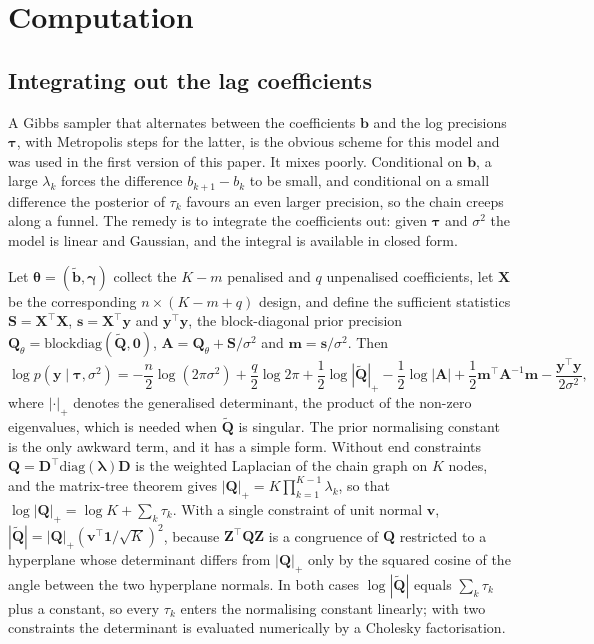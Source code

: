 \documentclass[11pt]{article}
\newcommand{\by}{\mathbf{y}}
\newcommand{\bb}{\mathbf{b}}
\newcommand{\bX}{\mathbf{X}}
\newcommand{\bQ}{\mathbf{Q}}
\newcommand{\bD}{\mathbf{D}}
\newcommand{\bS}{\mathbf{S}}
\newcommand{\bA}{\mathbf{A}}
\newcommand{\bZ}{\mathbf{Z}}
\newcommand{\bgamma}{\bm{\gamma}}
\newcommand{\btheta}{\bm{\theta}}
\newcommand{\bone}{\mathbf{1}}
\newcommand{\blambda}{\bm{\lambda}}
\newcommand{\btau}{\bm{\tau}}
\newcommand{\bzero}{\mathbf{0}}
\begin{document}
\section{Computation}
\label{sec:comp}

\subsection{Integrating out the lag coefficients}
\label{sec:collapse}

A Gibbs sampler that alternates between the coefficients $\bb$ and the log
precisions $\btau$, with Metropolis steps for the latter, is the obvious
scheme for this model and was used in the first version of this paper. It
mixes poorly. Conditional on $\bb$, a large $\lambda_k$ forces the difference
$b_{k+1} - b_k$ to be small, and conditional on a small difference the
posterior of $\tau_k$ favours an even larger precision, so the chain creeps
along a funnel. The remedy is to integrate the coefficients out: given
$\btau$ and $\sigma^2$ the model is linear and Gaussian, and the integral is
available in closed form.

Let $\btheta = (\tilde{\bb}, \bgamma)$ collect the $K - m$ penalised and $q$
unpenalised coefficients, let $\bX$ be the corresponding $n \times (K - m +
q)$ design, and define the sufficient statistics $\bS = \bX^\top \bX$,
$\mathbf{s} = \bX^\top \by$ and $\by^\top \by$, the block-diagonal prior
precision $\bQ_\theta = \mbox{blockdiag}(\tilde{\bQ}, \bzero)$, $\bA =
\bQ_\theta + \bS / \sigma^2$ and $\mathbf{m} = \mathbf{s} / \sigma^2$. Then
\begin{equation}
\log p(\by \mid \btau, \sigma^2) = -\frac{n}{2} \log(2\pi\sigma^2)
+ \frac{q}{2} \log 2\pi + \frac{1}{2} \log |\tilde{\bQ}|_{+}
- \frac{1}{2} \log |\bA| + \frac{1}{2} \mathbf{m}^\top \bA^{-1} \mathbf{m}
- \frac{\by^\top \by}{2 \sigma^2},
\label{eq:collapsed}
\end{equation}
where $|\cdot|_{+}$ denotes the generalised determinant, the product of the
non-zero eigenvalues, which is needed when $\tilde{\bQ}$ is singular. The
prior normalising constant is the only awkward term, and it has a simple
form. Without end constraints $\bQ = \bD^\top \mbox{diag}(\blambda) \bD$ is
the weighted Laplacian of the chain graph on $K$ nodes, and the matrix-tree
theorem \citep{kirchhoff1847, rue2005} gives $|\bQ|_{+} = K \prod_{k=1}^{K-1}
\lambda_k$, so that $\log |\bQ|_{+} = \log K + \sum_k \tau_k$. With a single
constraint of unit normal $\mathbf{v}$, $|\tilde{\bQ}| = |\bQ|_{+}
(\mathbf{v}^\top \bone / \sqrt{K})^2$, because $\bZ^\top \bQ \bZ$ is a
congruence of $\bQ$ restricted to a hyperplane whose determinant differs
from $|\bQ|_{+}$ only by the squared cosine of the angle between the two
hyperplane normals. In both cases $\log |\tilde{\bQ}|$ equals $\sum_k
\tau_k$ plus a constant, so every $\tau_k$ enters the normalising constant
linearly; with two constraints the determinant is evaluated numerically by a
Cholesky factorisation.
\end{document}
